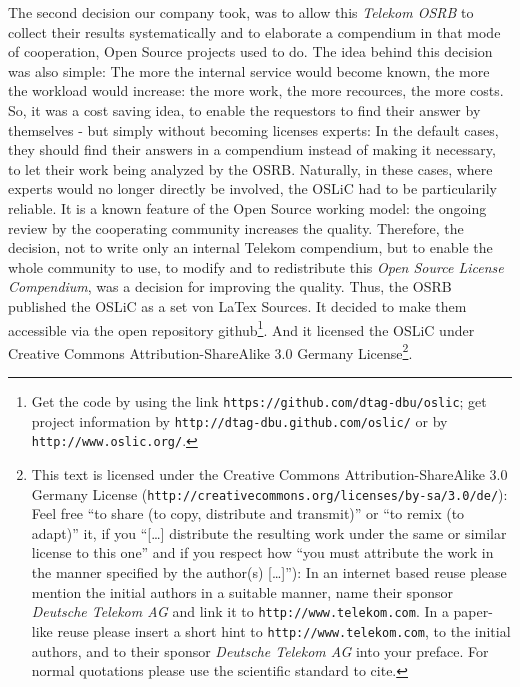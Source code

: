 The second decision our company took, was to allow this \emph{Telekom OSRB} to
collect their results systematically and to elaborate a compendium in that mode
of cooperation, Open Source projects used to do. The idea behind this decision
was also simple: The more the internal service would become known, the more the
workload would increase: the more work, the more recources, the more costs. So,
it was a cost saving idea, to enable the requestors to find their answer by
themselves - but simply without becoming licenses experts: In the default cases,
they should find their answers in a compendium instead of making it necessary,
to let their work being analyzed by the OSRB. Naturally, in these cases, where
experts would no longer directly be involved, the OSLiC had to be particularily
reliable. It is a known feature of the Open Source working model: the ongoing
review by the cooperating community increases the quality. Therefore, the
decision, not to write only an internal Telekom compendium, but to enable the
whole community to use, to modify and to redistribute this \emph{Open Source
License Compendium}, was a decision for improving the quality. Thus, the OSRB
published the OSLiC as a set von LaTex Sources. It decided to make them
accessible via the open repository github\footnote{Get the code by using the
link \texttt{https://github.com/dtag-dbu/oslic}; get project information by
\texttt{http://dtag-dbu.github.com/oslic/} or by
\texttt{http://www.oslic.org/}.}. And it licensed the OSLiC under Creative
Commons Attribution-ShareAlike 3.0 Germany License\footnote{ This text is
licensed under the Creative Commons Attribution-ShareAlike 3.0 Germany License
(\texttt{http://creativecommons.org/licenses/by-sa/3.0/de/}): Feel free
\enquote{to share (to copy, distribute and transmit)} or \enquote{to remix (to
adapt)} it, if you \enquote{[\ldots] distribute the resulting work under the
same or similar license to this one} and if you respect how \enquote{you must
attribute the work in the manner specified by the author(s) [\ldots]}):
In an internet based reuse please mention the initial authors in a suitable
manner, name their sponsor \textit{Deutsche Telekom AG} and link it to
\texttt{http://www.telekom.com}. In a paper-like reuse please insert a short
hint to \texttt{http://www.telekom.com}, to the initial authors, and to their
sponsor \textit{Deutsche Telekom AG} into your preface. For normal quotations
please use the scientific standard to cite.
\newline { \tiny \itshape [LaTeX form derived from myCsrf (= 'mind your Scholar
Research Framework') \copyright K. Reincke CC BY 3.0  http://mycsrf.fodina.de/)]
} }. 

